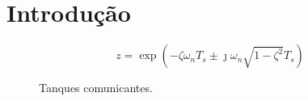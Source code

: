 \chapter{Introdução}
\begin{equation}
    z = \exp{\left(-\zeta\omega_nT_s\pm\jmath\omega_n\sqrt{1-\zeta^2}T_s\right)}
\end{equation}

\begin{center}
    \begin{figure}[b]
        \centering
        
        \caption{Tanques comunicantes.}
        \label{fig:tanques_comunicantes}
    \end{figure}
\end{center}